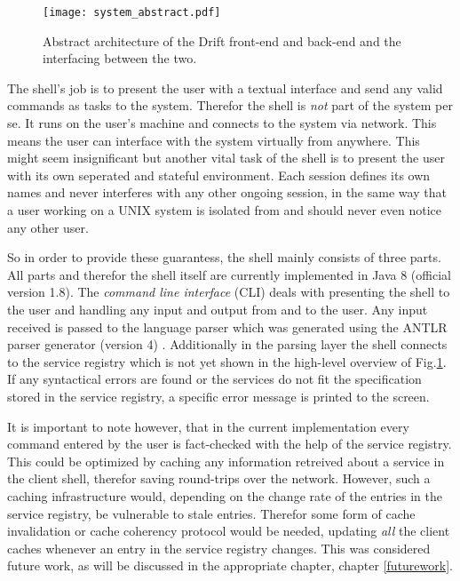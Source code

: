 \begin{figure}[h]
  \texttt{[image: system\_abstract.pdf]}
  \caption{Abstract architecture of the Drift front-end and back-end
           and the interfacing between the two.}
  \label{system-abstract}
\end{figure}

The shell's job is to present the user with a textual interface
and send any valid commands as tasks to the system. Therefor
the shell is \textit{not} part of the system per se. It runs
on the user's machine and connects to the system via network.
This means the user can interface with the system virtually from
anywhere.
This might seem insignificant but another vital task of
the shell is to present the user with its own
seperated and stateful environment. Each session defines its own
names and never interferes with any other ongoing session, in the
same way that a user working on a UNIX system is isolated from
and should never even notice any other user.

So in order to provide these guarantess, the shell mainly consists of
three parts. All parts and therefor the shell itself are currently
implemented in Java 8 (official version 1.8).
The \textit{command line interface} (CLI) deals with presenting
the shell to the user and handling any input and output from
and to the user. Any input received is passed to the
language parser which was generated using the ANTLR parser
generator (version 4) \cite{antlr}. Additionally in the
parsing layer the shell connects to the service registry which
is not yet shown in the high-level overview of Fig.\ref{system-abstract}.
If any syntactical errors are found or the services do not fit
the specification stored in the service registry, a specific error
message is printed to the screen.

It is important to note however, that in the current implementation
every command entered by the user is fact-checked with the help
of the service registry. This could be optimized by caching any
information retreived about a service in the client shell, therefor
saving round-trips over the network. However, such a caching
infrastructure would, depending on the change rate of the entries
in the service registry, be vulnerable to stale entries. Therefor
some form of cache invalidation or cache coherency protocol would
be needed, updating \textit{all} the client caches
whenever an entry in the service registry changes.
This was considered future work, as will be discussed in the
appropriate chapter, chapter \ref{futurework}.

